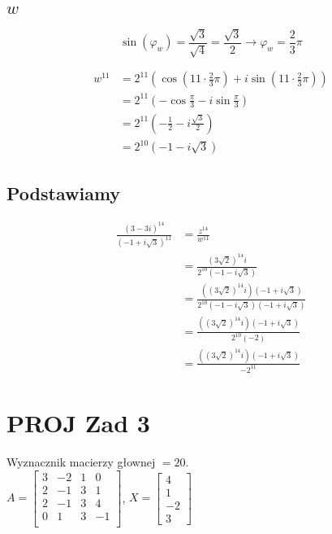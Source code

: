 \documentclass[11pt]{article}
\begin{document}
\subsection{\(w\)}
\label{sec:orgc80b2fb}
$$\sin(\varphi_w) = \frac{\sqrt{3}}{\sqrt{4}} = \frac{\sqrt{3}}{2}
\to \varphi_w = \frac{2}{3} \pi$$

\begin{align*}
w^{11} &= 2^{11} \left( \cos \left(11 \cdot \frac{2}{3} \pi \right)
+ i \sin \left( 11 \cdot \frac{2}{3} \pi \right) \right)\\
&= 2^{11} \left( -\cos \frac{\pi}{3}
- i \sin \frac{\pi}{3} \right)\\
&= 2^{11} \left(- \frac{1}{2} - i \frac{\sqrt{3}}{2} \right)\\
&= 2^{10} \left(-1 - i \sqrt{3} \right)
\end{align*}
\subsection{Podstawiamy}
\label{sec:org8e600c9}
\begin{align*}
\frac{ { (3 - 3i)}^{14} }
{ { (-1+i\sqrt{3}) }^{11} }
&= \frac{z^{14}}{w^{11}}\\
&=\frac{(3\sqrt{2})^{14} i }
{2^{10}(-1 -i\sqrt{3})}\\
&=\frac{ ((3\sqrt{2})^{14} i)(-1 + i\sqrt{3}) }
{2^{10}(-1 -i\sqrt{3})(-1 + i\sqrt{3})}\\
&=\frac{ ((3\sqrt{2})^{14} i)(-1 + i\sqrt{3}) }
{2^{10}(-2)}\\
&=\frac{ ((3\sqrt{2})^{14} i)(-1 + i\sqrt{3}) }
{-2^{11}}
\end{align*}
\section{{\bfseries\sffamily PROJ} Zad 3}
\label{sec:orgdd123bf}
Wyznacznik macierzy głownej \(= 20\).
\\\empty
\(A = \begin{bmatrix}
3  & -2 & 1 & 0 \\
2  & -1 & 3 & 1 \\
2 & -1 & 3 & 4 \\
0 & 1 & 3 & -1 \\
\end{bmatrix}\),
\(X = \begin{bmatrix}
4\\
1\\
-2\\
3
\end{bmatrix}\)
\end{document}
